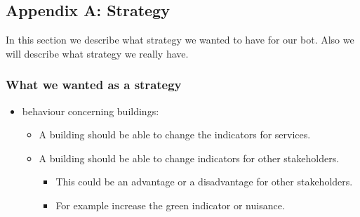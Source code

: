\subsection{Appendix A: Strategy}
\label{sec:appendixa}
In this section we describe what strategy we wanted to have for our bot. Also we will describe what strategy we really have.
\subsubsection{What we wanted as a strategy}
\begin{itemize}
	\item behaviour concerning buildings:
	\begin{itemize}
		\item  A building should be able to change the indicators for services.
		\item A building should be able to change indicators for other stakeholders.
		\begin{itemize}
			\item This could be an advantage or a disadvantage for other stakeholders.
			\item For example increase the green indicator or nuisance.
		\end{itemize}
	

\end{itemize}
\end{itemize}

